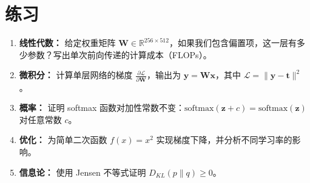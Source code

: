 \section{练习}

\begin{enumerate}
    \item \textbf{线性代数：} 给定权重矩阵 $\mathbf{W} \in \mathbb{R}^{256 \times 512}$，如果我们包含偏置项，这一层有多少参数？写出单次前向传递的计算成本（FLOPs）。
    
    \item \textbf{微积分：} 计算单层网络的梯度 $\frac{\partial \mathcal{L}}{\partial \mathbf{W}}$，输出为 $\mathbf{y} = \mathbf{W}\mathbf{x}$，其中 $\mathcal{L} = \|\mathbf{y} - \mathbf{t}\|^2$。
    
    \item \textbf{概率：} 证明 softmax 函数对加性常数不变：$\text{softmax}(\mathbf{z} + c) = \text{softmax}(\mathbf{z})$ 对任意常数 $c$。
    
    \item \textbf{优化：} 为简单二次函数 $f(x) = x^2$ 实现梯度下降，并分析不同学习率的影响。
    
    \item \textbf{信息论：} 使用 Jensen 不等式证明 $D_{KL}(p \| q) \geq 0$。
\end{enumerate}
